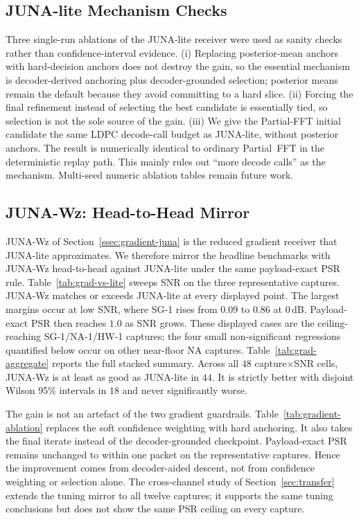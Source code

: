 \documentclass[journal]{IEEEtran}
\newcommand{\junalite}{JUNA-lite}
\newcommand{\junawz}{JUNA-Wz}
\begin{document}
\subsection{\texorpdfstring{\junalite{}}{JUNA-lite} Mechanism Checks}
Three single-run ablations of the \junalite{} receiver were used as sanity checks
rather than confidence-interval evidence. (i) Replacing posterior-mean anchors with
hard-decision anchors does not destroy the gain, so the essential mechanism is
decoder-derived anchoring plus decoder-grounded selection; posterior means remain
the default because they avoid committing to a hard slice. (ii) Forcing the final
refinement instead of selecting the best candidate is essentially tied, so
selection is not the sole source of the gain. (iii) We give the Partial-FFT initial candidate
the same LDPC decode-call budget as \junalite{}, without posterior anchors. The
result is numerically identical to ordinary Partial~FFT in the deterministic
replay path. This mainly rules out ``more decode calls'' as the mechanism. Multi-seed numeric
ablation tables remain future work.

\subsection{\texorpdfstring{\junawz{}}{JUNA-Wz}: Head-to-Head Mirror}
\label{ssec:gradient-mirror}\label{ssec:gradient-ablation}
\junawz{} of Section~\ref{ssec:gradient-juna} is the reduced gradient receiver
that \junalite{} approximates. We therefore mirror the headline benchmarks with
\junawz{} head-to-head against \junalite{} under the same payload-exact PSR rule.
Table~\ref{tab:grad-vs-lite} sweeps SNR on the three representative captures.
\junawz{} matches or exceeds \junalite{} at every displayed point. The largest
margins occur at low SNR, where SG-1 rises from $0.09$ to $0.86$ at $0$\,dB.
Payload-exact PSR then reaches $1.0$ as SNR grows. These displayed cases are
the ceiling-reaching SG-1/NA-1/HW-1 captures;
the four small non-significant regressions quantified below occur on other
near-floor NA captures. Table~\ref{tab:grad-aggregate} reports the full stacked
summary. Across all $48$ capture$\times$SNR cells, \junawz{} is at least as good
as \junalite{} in $44$. It is strictly better with disjoint Wilson 95\%
intervals in $18$ and never significantly worse.

The gain is not an artefact of the two gradient guardrails.
Table~\ref{tab:gradient-ablation} replaces the soft confidence weighting with
hard anchoring. It also takes the final iterate instead of the decoder-grounded
checkpoint. Payload-exact PSR remains unchanged to within one packet on the
representative captures. Hence the improvement comes from decoder-aided descent,
not from confidence weighting or selection alone.
The cross-channel study of Section~\ref{sec:transfer} extends the tuning mirror
to all twelve captures; it supports the same tuning conclusions but does not
show the same PSR ceiling on every capture.
\end{document}

